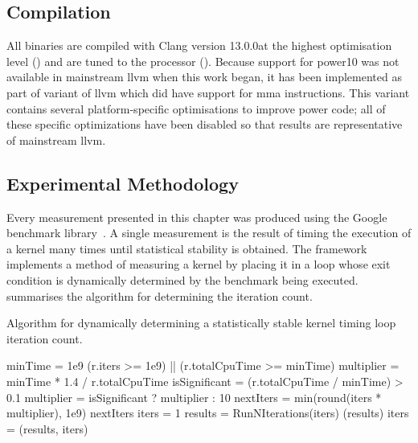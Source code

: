 \documentclass[\main/thesis.tex]{subfiles}
\begin{document}
\subsection{Compilation}
All binaries are compiled with Clang version 13.0.0\footnotemark   at the highest optimisation level () and are tuned to the processor ().
Because support for \gls{power10} was not available in mainstream \gls{llvm} when this work began, it has been implemented as part of  variant of \gls{llvm} which did have support for \gls{mma} instructions.
This variant contains several platform-specific optimisations to improve \gls{power} code; all of these specific optimizations have been disabled so that results are representative of mainstream \gls{llvm}.

\subsection{Experimental Methodology}

Every measurement presented in this chapter was produced using the Google\texttrademark{} benchmark library\footnotemark~\autocite{googlebench}.
A single measurement is the result of timing the execution of a kernel many times until statistical stability is obtained.
The framework implements a method of measuring a kernel by placing it in a loop whose exit condition is dynamically determined by the benchmark being executed.
 summarises the algorithm for determining the iteration count.

\begin{algorithm}[t]
  \caption[Algorithm for creating a cycle measurement]{Algorithm for dynamically determining a statistically stable kernel timing loop iteration count.}
  \label{alg:benchmark}
  \begin{algorithmic}[1]
    \State minTime = 1e9 
      \State \Return (r.iters >= 1e9) || (r.totalCpuTime >= minTime)
    \EndFunction
      \State multiplier = minTime * 1.4 / r.totalCpuTime
      \State isSignificant = (r.totalCpuTime / minTime) > 0.1
      \State multiplier = isSignificant ? multiplier : 10
      \State nextIters = min(round(iters * multiplier), 1e9)
      \State \Return nextIters
    \EndFunction
      \State iters = 1
        \State results = RunNIterations(iters)
          \State {}(results)
          \State \Return
        \EndIf
        \State iters = (results, iters)
      \EndWhile
    \EndFunction
  \end{algorithmic}
\end{algorithm}
\end{document}
